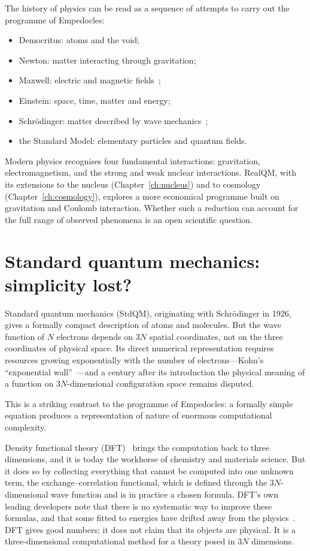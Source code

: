 The history of physics can be read as a sequence of attempts to carry out the programme of Empedocles:
\begin{itemize}
\item Democritus: atoms and the void;
\item Newton: matter interacting through gravitation;
\item Maxwell: electric and magnetic fields~\cite{Maxwell1865};
\item Einstein: space, time, matter and energy;
\item Schr\"odinger: matter described by wave mechanics~\cite{Schrodinger1926};
\item the Standard Model: elementary particles and quantum fields.
\end{itemize}
Modern physics recognises four fundamental interactions: gravitation, electromagnetism, and the strong and
weak nuclear interactions. RealQM, with its extensions to the nucleus (Chapter~\ref{ch:nucleus}) and to
cosmology (Chapter~\ref{ch:cosmology}), explores a more economical programme built on gravitation and
Coulomb interaction. Whether such a reduction can account for the full range of observed phenomena is an
open scientific question.

\section{Standard quantum mechanics: simplicity lost?}\label{sec:simplicity-lost}

Standard quantum mechanics (StdQM), originating with Schr\"odinger in 1926, gives a formally compact
description of atoms and molecules. But the wave function of $N$ electrons depends on $3N$ spatial
coordinates, not on the three coordinates of physical space. Its direct numerical representation requires
resources growing exponentially with the number of electrons---Kohn's ``exponential wall''~\cite{Kohn1999}---and
a century after its introduction the physical meaning of a function on $3N$-dimensional configuration space
remains disputed.

This is a striking contrast to the programme of Empedocles: a formally simple equation produces a
representation of nature of enormous computational complexity.

Density functional theory (DFT)~\cite{HK64,KS65} brings the computation back to three dimensions, and it is
today the workhorse of chemistry and materials science. But it does so by collecting everything that cannot
be computed into one unknown term, the exchange--correlation functional, which is defined through the
$3N$-dimensional wave function and is in practice a chosen formula. DFT's own leading developers note that
there is no systematic way to improve these formulas, and that some fitted to energies have drifted away from
the physics~\cite{Burke2012,Medvedev2017}. DFT gives good numbers; it does not claim that its objects are
physical. It is a three-dimensional computational method for a theory posed in $3N$ dimensions.

